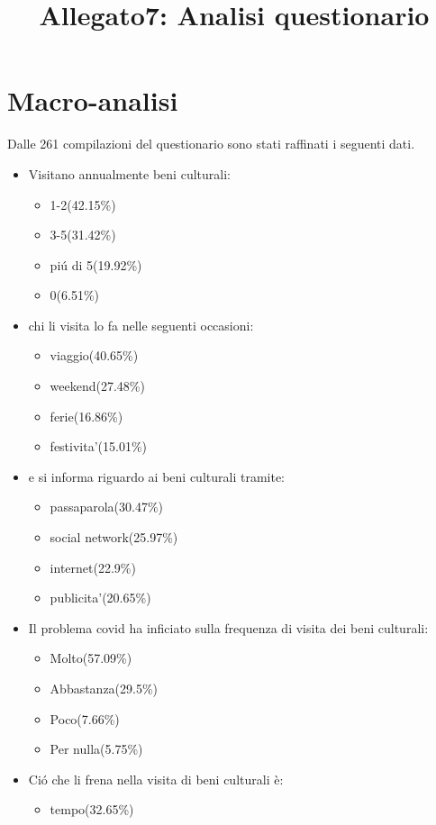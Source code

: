 \documentclass{article}
\title{\textbf{Allegato7: Analisi questionario}}
\date{}
\begin{document}
\maketitle

\section{Macro-analisi}
Dalle 261 compilazioni del questionario sono stati raffinati i seguenti dati.
\begin{itemize}
\item Visitano annualmente beni culturali:
	\begin{itemize}
	\item 1-2(42.15\%)
	\item 3-5(31.42\%)
	\item piú di 5(19.92\%)
	\item 0(6.51\%)
	\end{itemize}
\item chi li visita lo fa nelle seguenti occasioni:
	\begin{itemize}
	\item viaggio(40.65\%)
	\item weekend(27.48\%)
	\item ferie(16.86\%)
	\item festivita'(15.01\%)
	\end{itemize}
\item e si informa riguardo ai beni culturali tramite:
	\begin{itemize}
	\item passaparola(30.47\%)
	\item social network(25.97\%)
	\item internet(22.9\%)
	\item publicita'(20.65\%)
	\end{itemize}
\item Il problema covid ha inficiato sulla frequenza di visita dei beni culturali:
	\begin{itemize}
	\item Molto(57.09\%)
	\item Abbastanza(29.5\%)
	\item Poco(7.66\%)
	\item Per nulla(5.75\%)
	\end{itemize}
\item Ció che li frena nella visita di beni culturali è:
	\begin{itemize}
	\item tempo(32.65\%)

\end{itemize}
\end{itemize}
\end{document}
